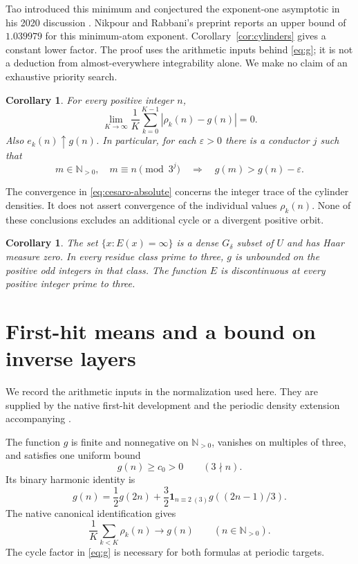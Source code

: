 \documentclass[11pt]{article}
\newtheorem{corollary}[theorem]{Corollary}
\theoremstyle{remark}
\newcommand{\NN}{\mathbb N_{>0}}
\newcommand{\one}{\mathbf 1}
\begin{document}
Tao introduced this minimum and conjectured the exponent-one
asymptotic in his 2020 discussion \cite{Tao2020}.
Nikpour and Rabbani's preprint \cite{NikpourRabbani} reports an
upper bound of \(1.039979\) for this minimum-atom exponent.
Corollary~\ref{cor:cylinders} gives a constant lower factor.
The proof uses the arithmetic inputs behind \eqref{eq:g}; it is
not a deduction from almost-everywhere integrability alone.
We make no claim of an exhaustive priority search.

\begin{corollary}\label{cor:integer}
For every positive integer \(n\),
\begin{equation}\label{eq:cesaro-absolute}
 \lim_{K\to\infty}\frac1K\sum_{k=0}^{K-1}|\rho_k(n)-g(n)|=0.
\end{equation}
Also \(e_k(n)\uparrow g(n)\). In particular, for each
\(\varepsilon>0\) there is a conductor \(j\) such that
\[
 m\in\NN,\quad m\equiv n\pmod{3^j}
 \quad\Longrightarrow\quad g(m)>g(n)-\varepsilon.
\]
\end{corollary}

The convergence in \eqref{eq:cesaro-absolute} concerns the integer
trace of the cylinder densities. It does not assert convergence of
the individual values \(\rho_k(n)\). None of these conclusions
excludes an additional cycle or a divergent positive orbit.

\begin{corollary}\label{cor:infinity}
The set \(\{x:E(x)=\infty\}\) is a dense \(G_\delta\) subset
of \(U\) and has Haar measure zero. In every residue class prime
to three, \(g\) is unbounded on the positive odd integers in that
class. The function \(E\) is discontinuous at every positive
integer prime to three.
\end{corollary}

\section{First-hit means and a bound on inverse layers}

We record the arithmetic inputs in the normalization used here.
They are supplied by the native first-hit development and the
periodic density extension accompanying \cite{Basins}.

The function \(g\) is finite and nonnegative on \(\NN\), vanishes
on multiples of three, and satisfies one uniform bound
\begin{equation}\label{eq:integer-floor}
 g(n)\geq c_0>0\qquad(3\nmid n).
\end{equation}
Its binary harmonic identity is
\begin{equation}\label{eq:harmonic}
 g(n)=\frac12 g(2n)+\frac32\one_{n\equiv2\ (3)}g((2n-1)/3).
\end{equation}
The native canonical identification gives
\begin{equation}\label{eq:cesaro-input}
 \frac1K\sum_{k<K}\rho_k(n)\longrightarrow g(n)
 \qquad(n\in\NN).
\end{equation}
The cycle factor in \eqref{eq:g} is necessary for both formulas
at periodic targets.
\end{document}
